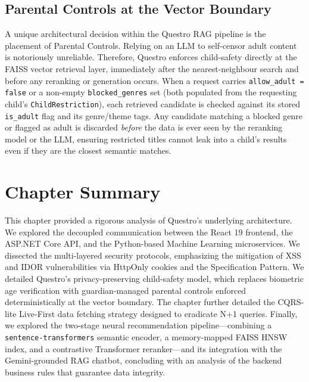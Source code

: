 \subsection{Parental Controls at the Vector Boundary}
\label{sec:vector_boundary}
A unique architectural decision within the Questro RAG pipeline is the placement of Parental Controls. Relying on an LLM to self-censor adult content is notoriously unreliable. Therefore, Questro enforces child-safety directly at the FAISS vector retrieval layer, immediately after the nearest-neighbour search and before any reranking or generation occurs.
When a request carries \texttt{allow\_adult = false} or a non-empty \texttt{blocked\_genres} set (both populated from the requesting child's \texttt{ChildRestriction}), each retrieved candidate is checked against its stored \texttt{is\_adult} flag and its genre/theme tags. Any candidate matching a blocked genre or flagged as adult is discarded \textit{before} the data is ever seen by the reranking model or the LLM, ensuring restricted titles cannot leak into a child's results even if they are the closest semantic matches.

\section{Chapter Summary}
This chapter provided a rigorous analysis of Questro's underlying architecture. We explored the decoupled communication between the React 19 frontend, the ASP.NET Core API, and the Python-based Machine Learning microservices. We dissected the multi-layered security protocols, emphasizing the mitigation of XSS and IDOR vulnerabilities via HttpOnly cookies and the Specification Pattern. We detailed Questro's privacy-preserving child-safety model, which replaces biometric age verification with guardian-managed parental controls enforced deterministically at the vector boundary. The chapter further detailed the CQRS-lite Live-First data fetching strategy designed to eradicate N+1 queries. Finally, we explored the two-stage neural recommendation pipeline---combining a \texttt{sentence-transformers} semantic encoder, a memory-mapped FAISS HNSW index, and a contrastive Transformer reranker---and its integration with the Gemini-grounded RAG chatbot, concluding with an analysis of the backend business rules that guarantee data integrity.
